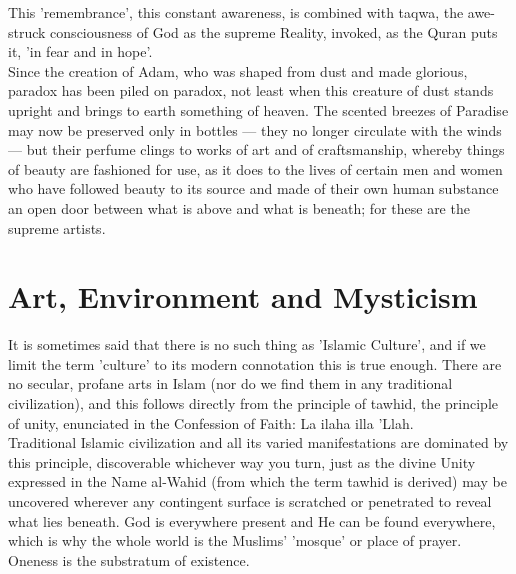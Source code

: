\documentclass[10pt, twoside]{book}
\begin{document}
This 'remembrance', this constant awareness, is combined with taqwa, the awe\hyp{}struck consciousness of 
God as the supreme Reality, invoked, as the Quran puts it, 'in fear and in hope'. \\

Since the creation of Adam, who was shaped from dust and made glorious, paradox has been piled on 
paradox, not least when this creature of dust stands upright and brings to earth something of heaven. 
The scented breezes of Paradise may now be preserved only in bottles --- they no longer circulate with 
the winds --- but their perfume clings to works of art and of craftsmanship, whereby things of beauty 
are fashioned for use, as it does to the lives of certain men and women who have followed beauty to 
its source and made of their own human substance an open door between what is above and what is 
beneath; for these are the supreme artists. \\


\chapter{Art, Environment and Mysticism}

It is sometimes said that there is no such thing as 'Islamic Culture', and if we limit the term 
'culture' to its modern connotation this is true enough. There are no secular, profane arts in Islam 
(nor do we find them in any traditional civilization), and this follows directly from the principle 
of tawhid, the principle of unity, enunciated in the Confession of Faith: La ilaha illa 'Llah. \\

Traditional Islamic civilization and all its varied manifestations are dominated by this principle, 
discoverable whichever way you turn, just as the divine Unity expressed in the Name al\hyp{}Wahid (from 
which the term tawhid is derived) may be uncovered wherever any contingent surface is scratched or 
penetrated to reveal what lies beneath. God is everywhere present and He can be found everywhere, 
which is why the whole world is the Muslims' 'mosque' or place of prayer. Oneness is the substratum 
of existence. \\
\end{document}
